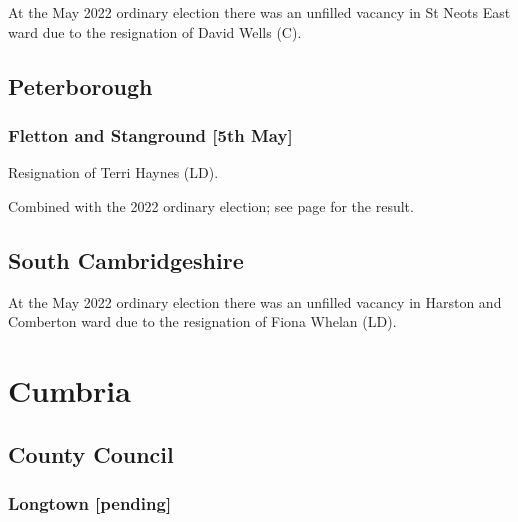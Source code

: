 \documentclass[a4paper,openany]{book}
\begin{document}
\begin{resultsiii}
At the May 2022 ordinary election there was an unfilled vacancy in St Neots East ward due to the resignation of David Wells (C).%

\subsection*{Peterborough}

\subsubsection*{Fletton and Stanground \hspace*{\fill}\nolinebreak[1]%
	\enspace\hspace*{\fill}
	[5th May]}


Resignation of Terri Haynes (LD).

Combined with the 2022 ordinary election; see page \pageref{PeterboroughFlettonStanground} for the result.

\subsection*{South Cambridgeshire}

At the May 2022 ordinary election there was an unfilled vacancy in Harston and Comberton ward due to the resignation of Fiona Whelan (LD).%

\section{Cumbria}

\subsection*{County Council}

\subsubsection*{Longtown \hspace*{\fill}\nolinebreak[1]%
	\enspace\hspace*{\fill}
	[pending]}


\end{resultsiii}
\end{document}
